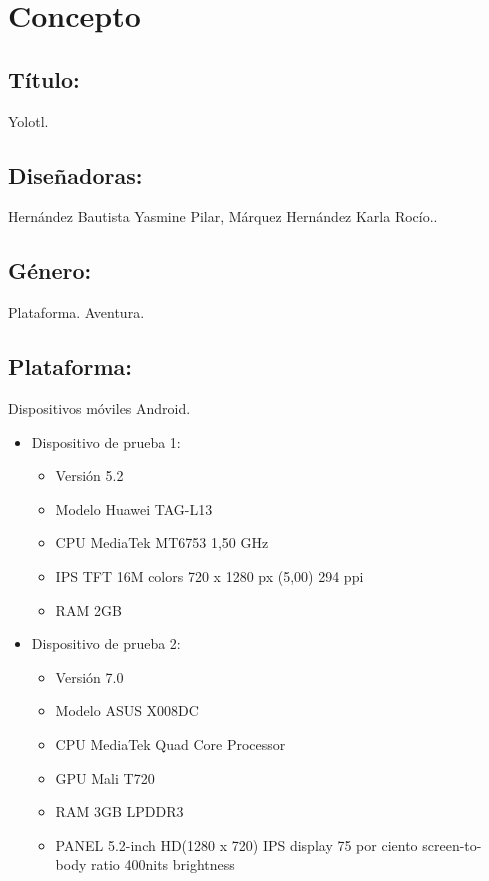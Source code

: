\chapter{Concepto}

		\section{Título:} Yolotl.
		\section{Diseñadoras:} Hernández Bautista 				Yasmine Pilar,  Márquez Hernández Karla Rocío..
    	\section{Género:} Plataforma. Aventura.
   		\section{Plataforma:} Dispositivos móviles Android.    			\begin{itemize}
   		
			\item Dispositivo de prueba 1:
   		\begin{itemize}
   			\item Versión 5.2
   			\item Modelo Huawei TAG-L13
   			\item CPU MediaTek MT6753 1,50 GHz
   			\item IPS TFT 16M colors 720 x 1280 px (5,00) 294 ppi
   			\item RAM 2GB
   			
   		\end{itemize}
   		
   		\item Dispositivo de prueba 2:
   		\begin{itemize}
   			\item Versión 7.0
   			\item Modelo ASUS X008DC
   			\item CPU MediaTek Quad Core Processor
   			\item GPU Mali T720
   			\item RAM 3GB LPDDR3
   			\item PANEL 5.2-inch
   			HD(1280 x 720) IPS display 
   			75 por ciento screen-to-body ratio
   			400nits brightness 
   		\end{itemize}   		
   		
   		\end{itemize}
